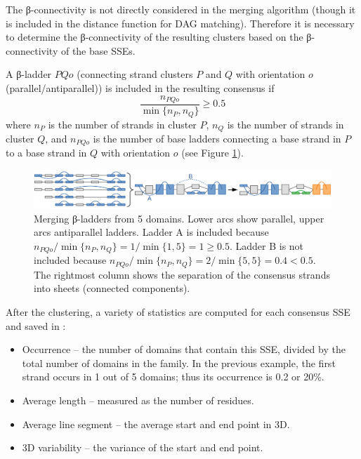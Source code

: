 \documentclass{article}
\begin{document}
The β-connectivity is not directly considered in the merging algorithm 
(though it is included in the distance function for DAG matching).
Therefore it is necessary to determine the β\nobreakdash-connectivity of the resulting clusters 
based on the β-connectivity of the base SSEs.

A β-ladder \(PQo\) (connecting strand clusters \(P\) and \(Q\) with orientation \(o\) (parallel/antiparallel)) 
is included in the resulting consensus if
  \[  \frac { n_{PQo} } { \min{\{n_P, n_Q\}} } \geq 0.5  \]
where \(n_P\) is the number of strands in cluster \(P\), 
\(n_Q\) is the number of strands in cluster \(Q\),
and \(n_{PQo}\) is the number of base ladders connecting a base strand in \(P\) to a base strand in \(Q\)
with orientation \(o\) (see Figure \ref{fig:dag_ladders}).

\begin{figure}[h!]
  \centering\includegraphics[width=\linewidth]{figures/dag_ladders.png}
  \caption{Merging β-ladders from 5 domains. 
  Lower arcs show parallel, upper arcs antiparallel ladders.
  Ladder A is included because \( n_{PQo} / \min{\{n_P, n_Q\}} = 1 / \min{\{1, 5\}} = 1 \geq 0.5\).
  Ladder B is not included because \( n_{PQo} / \min{\{n_P, n_Q\}} = 2 / \min{\{5, 5\}} = 0.4 < 0.5\).
  The rightmost column shows the separation of the consensus strands into sheets (connected components).}
  \label{fig:dag_ladders}
\end{figure}

After the clustering, a variety of statistics are computed for each consensus SSE and saved in : 
\begin{itemize}
  \item
    Occurrence -- the number of domains that contain this SSE, 
    divided by the total number of domains in the family. 
    In the previous example, the first strand occurs in 1 out of 5 domains; 
    thus its occurrence is 0.2 or 20\%.
  \item
    Average length -- measured as the number of residues.
  \item
    Average line segment -- the average start and end point in 3D.
  \item
    3D variability -- the variance of the start and end point.
\end{itemize}
\end{document}
